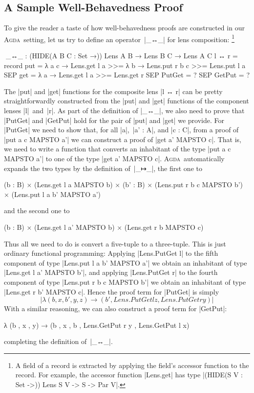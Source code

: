 \documentclass{sigplanconf}
\newcommand{\ucomma}{\kern1pt, }
\newcommand{\uperiod}{\kern1pt. }
\newcommand{\Agda}{\textsc{Agda}}
\begin{document}
\subsection{A Sample Well-Behavedness Proof}
\label{sec:sample-well-behavedness-proof}

To give the reader a taste of how well-behavedness proofs are constructed in our \Agda\ setting, let us try to define an operator~|_↔_| for lens composition:%
\footnote{A field of a record is extracted by applying the field's accessor function to the record.
For example, the accessor function |Lens.get| has type |(HIDE({S V : Set} ->)) Lens S V -> S -> Par V|.}
\begin{code}
^^^_↔_ : (HIDE({A B C : Set} →)) Lens A B → Lens B C → Lens A C
l ↔ r = record
  {    put  =  λ a c →  Lens.get l a >>= λ b →
                        Lens.put r b c >>= Lens.put l a
  SEP  get  = λ a → Lens.get l a >>= Lens.get r
  SEP  PutGet = ? SEP GetPut = ? }
\end{code}
The |put| and |get| functions for the composite lens |l ↔ r| can be pretty straightforwardly constructed from the |put| and |get| functions of the component lenses |l|~and~|r|.
As part of the definition of |_↔_|\ucomma we also need to prove that |PutGet| and |GetPut| hold for the pair of |put| and |get| we provide.
For |PutGet| we need to show that, for all |a|,~|a' : A|, and |c : C|, from a proof of |put a c MAPSTO a'| we can construct a proof of |get a' MAPSTO c|.
That is, we need to write a function that converts an inhabitant of the type |put a c MAPSTO a'| to one of the type |get a' MAPSTO c|.
\Agda\ automatically expands the two types by the definition of~|_↦_|\ucomma the first one to
\begin{code}
(b : B) × (Lens.get l a MAPSTO b) ×
  (b' : B) × (Lens.put r b c MAPSTO b') × (Lens.put l a b' MAPSTO a')
\end{code}
and the second one to
\begin{code}
(b : B) × (Lens.get l a' MAPSTO b) × (Lens.get r b MAPSTO c)
\end{code}
Thus all we need to do is convert a five-tuple to a three-tuple.
This is just ordinary functional programming: Applying |Lens.PutGet l| to the fifth component of type |Lens.put l a b' MAPSTO a'| we obtain an inhabitant of type |Lens.get l a' MAPSTO b'|, and applying |Lens.PutGet r| to the fourth component of type |Lens.put r b c MAPSTO b'| we obtain an inhabitant of type |Lens.get r b' MAPSTO c|.
Hence the proof term for |PutGet| is simply
\begin{equation}
|λ { (b , x , b' , y , z) → (b' , Lens.PutGet l z , Lens.PutGet r y) }|
\tag{$*$}
\label{lambda-expression}
\end{equation}
With a similar reasoning, we can also construct a proof term for |GetPut|:
\begin{code}
λ { (b , x , y) → (b , x , b , Lens.GetPut r y , Lens.GetPut l x) }
\end{code}
completing the definition of~|_↔_|\uperiod
\end{document}
